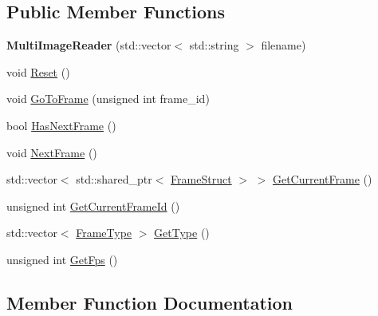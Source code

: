 \subsection*{Public Member Functions}
\begin{DoxyCompactItemize}
\item 
\mbox{\label{classmoetsi_1_1ssp_1_1MultiImageReader_a20a5450c538661d3951ea27a2ff92854}} 
{\bfseries Multi\+Image\+Reader} (std\+::vector$<$ std\+::string $>$ filename)
\item 
void \hyperlink{classmoetsi_1_1ssp_1_1MultiImageReader_a3a60b57e1db97cb170435dd7f0d4c66d}{Reset} ()
\item 
void \hyperlink{classmoetsi_1_1ssp_1_1MultiImageReader_a7c552a1ad469660ea0a88b9ca85138ad}{Go\+To\+Frame} (unsigned int frame\+\_\+id)
\item 
bool \hyperlink{classmoetsi_1_1ssp_1_1MultiImageReader_a04240c98d28d8949fca4ecdcb04f04f5}{Has\+Next\+Frame} ()
\item 
void \hyperlink{classmoetsi_1_1ssp_1_1MultiImageReader_a472e2b97ce7a1c2485abd14c276bb8fe}{Next\+Frame} ()
\item 
std\+::vector$<$ std\+::shared\+\_\+ptr$<$ \hyperlink{structmoetsi_1_1ssp_1_1FrameStruct}{Frame\+Struct} $>$ $>$ \hyperlink{classmoetsi_1_1ssp_1_1MultiImageReader_a6a0aceb3412f25580876a4fbcedf7ed0}{Get\+Current\+Frame} ()
\item 
unsigned int \hyperlink{classmoetsi_1_1ssp_1_1MultiImageReader_a994eea20e9682c2f4afc9303a34c76f3}{Get\+Current\+Frame\+Id} ()
\item 
std\+::vector$<$ \hyperlink{namespacemoetsi_1_1ssp_a46efdfa2cd5a28ead465dcc8006b5a87}{Frame\+Type} $>$ \hyperlink{classmoetsi_1_1ssp_1_1MultiImageReader_ad5f6cf0cfb1e64bcf569ab0bbfcce9d6}{Get\+Type} ()
\item 
unsigned int \hyperlink{classmoetsi_1_1ssp_1_1MultiImageReader_ad0a249af66f8e1a063c3e575fc1b94cb}{Get\+Fps} ()
\end{DoxyCompactItemize}


\subsection{Member Function Documentation}
\mbox{\label{classmoetsi_1_1ssp_1_1MultiImageReader_a6a0aceb3412f25580876a4fbcedf7ed0}} 
